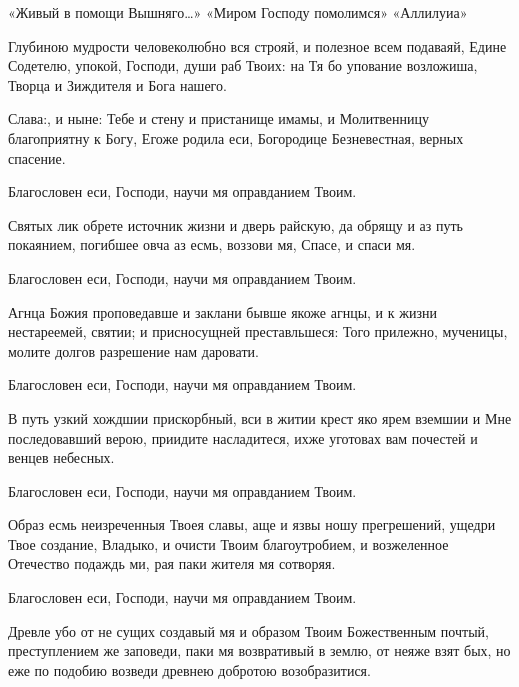 \begin{mymulticols}
 


 «Живый в помощи Вышняго…»  «Миром Господу помолимся»  «Аллилуиа» 




Глубиною мудрости человеколюбно вся строяй, и полезное всем подаваяй, Едине Содетелю, упокой, Господи, души раб Твоих: на Тя бо упование возложиша, Творца и Зиждителя и Бога нашего. 

Слава:, и ныне: Тебе и стену и пристанище имамы, и Молитвенницу благоприятну к Богу, Егоже родила еси, Богородице Безневестная, верных спасение.




 Благословен еси, Господи, научи мя оправданием Твоим. 

Святых лик обрете источник жизни и дверь райскую, да обрящу и аз путь покаянием, погибшее овча аз есмь, воззови мя, Спасе, и спаси мя. 

 Благословен еси, Господи, научи мя оправданием Твоим. 

Агнца Божия проповедавше и заклани бывше якоже агнцы, и к жизни нестареемей, святии; и присносущней преставльшеся: Того прилежно, мученицы, молите долгов разрешение нам даровати. 

 Благословен еси, Господи, научи мя оправданием Твоим. 

В путь узкий хождшии прискорбный, вси в житии крест яко ярем вземшии и Мне последовавший верою, приидите насладитеся, ихже уготовах вам почестей и венцев небесных. 

 Благословен еси, Господи, научи мя оправданием Твоим. 

Образ есмь неизреченныя Твоея славы, аще и язвы ношу прегрешений, ущедри Твое создание, Владыко, и очисти Твоим благоутробием, и возжеленное Отечество подаждь ми, рая паки жителя мя сотворяя. 

 Благословен еси, Господи, научи мя оправданием Твоим. 

Древле убо от не сущих создавый мя и образом Твоим Божественным почтый, преступлением же заповеди, паки мя возвративый в землю, от неяже взят бых, но еже по подобию возведи древнею добротою возобразитися. 


\end{mymulticols}
